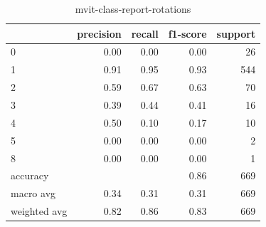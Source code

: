 \begin{table}[h!]
    \begin{tabular}{|l|r|r|r|r|}
        \hline
          &  precision &   recall & f1-score &  support \\ \hline
        0 &       0.00 &     0.00 &     0.00 &       26 \\
        1 &       0.91 &     0.95 &     0.93 &      544 \\
        2 &       0.59 &     0.67 &     0.63 &       70 \\
        3 &       0.39 &     0.44 &     0.41 &       16 \\
        4 &       0.50 &     0.10 &     0.17 &       10 \\
        5 &       0.00 &     0.00 &     0.00 &        2 \\
        8 &       0.00 &     0.00 &     0.00 &        1 \\
        \hline
        accuracy &            &          &     0.86 &      669 \\
        macro avg &       0.34 &     0.31 &     0.31 &      669 \\
        weighted avg &       0.82 &     0.86 &     0.83 &      669 \\ \hline
    \end{tabular}
    \caption[Rotation distribution]{mvit-class-report-rotations}
    \label{tbl:mvit-class-report-rotations}
\end{table}

